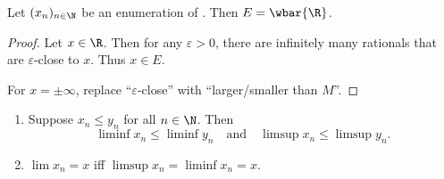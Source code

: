 \begin{example}
    Let $(x_n)_{n \in \N}$ be an enumeration of \Q.
    Then $E = \wbar{\R}$.
    \begin{proof}
        Let $x \in \R$.
        Then for any $\varepsilon > 0$, there are infinitely many rationals
        that are $\varepsilon$-close to $x$.
        Thus $x \in E$.

        For $x = \pm\infty$, replace ``$\varepsilon$-close'' with
        ``larger/smaller than $M$''.
    \end{proof}
\end{example}

\begin{theorem} \leavevmode
    \begin{enumerate}[label=(\arabic*)]
        \item Suppose $x_n \le y_n$ for all $n \in \N$.
        Then \[
            \liminf x_n \le \liminf y_n \quad \text{and} \quad
            \limsup x_n \le \limsup y_n.
        \]
        \item $\lim x_n = x$ iff $\limsup x_n = \liminf x_n = x$.
    \end{enumerate}
\end{theorem}
